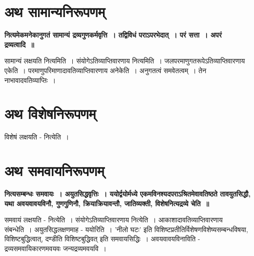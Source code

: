 \section*{अथ सामान्यनिरूपणम्}
{\bfseries नित्यमेकमनेकानुगतं सामान्यं द्रव्यगुणकर्मवृत्ति~। तद्विविधं पराऽपरभेदात्~। परं सत्ता~। अपरं द्रव्यत्वादि~॥}\par
	सामान्यं लक्षयति नित्यमिति~। संयोगेऽतिव्याप्तिवारणाय नित्यमिति~। जलपरमाणुगतरूपेऽतिव्याप्तिवारणाय एकेति~। परमाणुपरिमाणादावतिव्याप्तिवारणाय अनेकेति~। अनुगतत्वं समवेतत्वम्~। तेन नाभावादवतिव्याप्तिः~।\\[10pt]
\section*{अथ विशेषनिरूपणम्}
\par
	विशेषं लक्षयति - नित्येति~।\\
\section*{अथ समवायनिरूपणम्}
{\bfseries नित्यसम्बन्धः समवायः~। अयुतसिद्धवृत्तिः~। ययोर्द्वयोर्मध्ये एकमविनश्यदपराऽश्रितमेवावतिष्ठते तावयुतसिद्धौ, यथा अवयवावयविनौ, गुणगुणिनौ, क्रियाक्रियावन्तौ, जातिव्यक्ती, विशेषनित्यद्रव्ये चेति~॥}\par
	समवायं लक्षयति - नित्येति~। संयोगेऽतिव्याप्तिवारणाय नित्येति~। आकाशादावतिव्याप्तिवारणाय संबन्धेति~। अयुतसिद्धलक्षणमाह - ययोरिति~। ’नीलो घटः’ इति विशिष्टप्रतीतिर्विशेषणविशेष्यसम्बन्धविषया, विशिष्टबुद्धित्वात्, दण्डीति विशिष्टबुद्धिवत् इति समवायसिद्धिः~। अवयवावयविनाविति - द्रव्यसमवायिकारणमवयवः जन्यद्रव्यमवयवि~।\\
